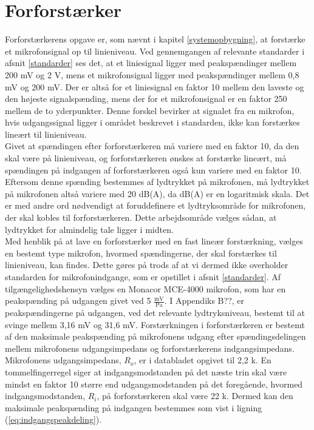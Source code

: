 \chapter{Forforstærker}
\label{forforstaerker}
Forforstærkerens opgave er, som nævnt i kapitel \ref{systemopbygning}, at forstærke et mikrofonsignal op til linieniveau. Ved gennemgangen af relevante standarder i afsnit \ref{standarder} ses det, at et liniesignal ligger med peakspændinger mellem 200 mV og 2 V, mens et mikrofonsignal ligger med peakspændinger mellem 0,8 mV og 200 mV. Der er altså for et liniesignal en faktor 10 mellem den laveste og den højeste signalspænding, mens der for et mikrofonsignal er en faktor 250 mellem de to yderpunkter. Denne forskel bevirker at signalet fra en mikrofon, hvis udgangssignal ligger i området beskrevet i standarden, ikke kan forstærkes lineært til linieniveau.\\ 
Givet at spændingen efter forforstærkeren må variere med en faktor 10, da den skal være på linieniveau, og forforstærkeren ønskes at forstærke lineært, må spændingen på indgangen af forforstærkeren også kun variere med en faktor 10. Eftersom denne spænding bestemmes af lydtrykket på mikrofonen, må lydtrykket på mikrofonen altså variere med 20 dB(A), da dB(A) er en logaritmisk skala. Det er med andre ord nødvendigt at foruddefinere et lydtryksområde for mikrofonen, der skal kobles til forforstærkeren. Dette arbejdsområde vælges sådan, at lydtrykket for almindelig tale ligger i midten. \\
Med henblik på at lave en forforstærker med en fast lineær forstærkning, vælges en bestemt type mikrofon, hvormed spændingerne, der skal forstærkes til linieniveau, kan findes. Dette gøres på trods af at vi dermed ikke overholder standarden for mikrofonindgange, som er opstillet i afsnit \ref{standarder}. Af tilgængelighedshensyn vælges en Monacor MCE-4000 mikrofon, som har en peakspænding på udgangen givet ved 5 $\mathrm{\tfrac{mV}{Pa}}$. I Appendiks B??, er peakspændingerne på udgangen, ved det relevante lydtryksniveau, bestemt til at svinge mellem 3,16 mV og 31,6 mV. Forstærkningen i forforstærkeren er bestemt af den maksimale peakspænding på mikrofonens udgang efter spændingsdelingen mellem mikrofonens udgangsimpedans og forforstærkerens indgangsimpedans. Mikrofonens udgangsimpedans, $R_o$, er i databladet \cite{mic-datablad} opgivet til 2,2 k\ohm. En tommelfingerregel siger at indgangsmodstanden på det næste trin skal være mindst en faktor 10 større end udgangsmodstanden på det foregående, hvormed indgangsmodstanden, $R_i$, på forforstærkeren skal være 22 k\ohm. Dermed kan den maksimale peakspænding på indgangen bestemmes som vist i ligning (\ref{eq:indgangspeakdeling}).

